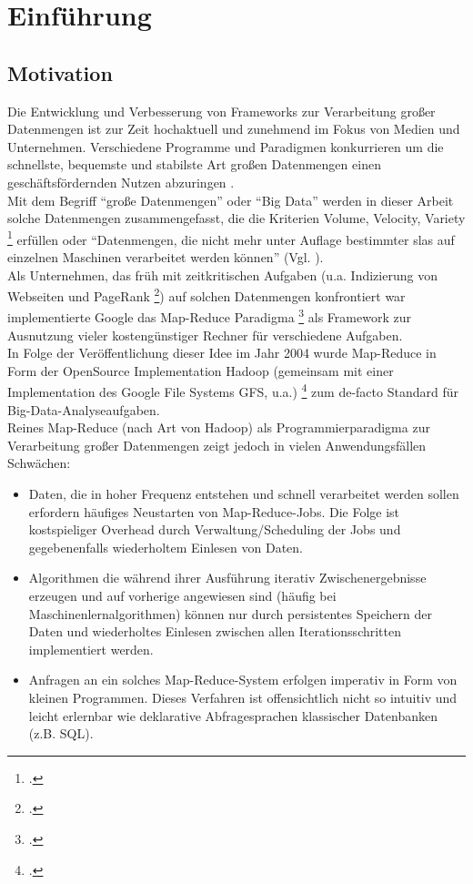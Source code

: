 \chapter{Einführung}

\section{Motivation}

Die Entwicklung und Verbesserung von Frameworks zur Verarbeitung großer Datenmengen ist zur Zeit hochaktuell und zunehmend im Fokus von Medien und Unternehmen. Verschiedene Programme und Paradigmen konkurrieren um die schnellste, bequemste und stabilste Art großen Datenmengen einen geschäftsfördernden Nutzen abzuringen \cite{Sin14}.\\

Mit dem Begriff "`große Datenmengen"' oder "`Big Data"' werden in dieser Arbeit solche Datenmengen zusammengefasst, die die Kriterien Volume, Velocity, Variety \footcite{Lan01} erfüllen oder "`Datenmengen, die nicht mehr unter Auflage bestimmter \gls{sla}s auf einzelnen Maschinen verarbeitet werden können"' (Vgl. \cite{Sam14}).\\

Als Unternehmen, das früh mit zeitkritischen Aufgaben (u.a.  Indizierung von Webseiten und PageRank \footcite{page2001method}) auf solchen Datenmengen konfrontiert war implementierte Google das Map-Reduce Paradigma \footcite{Dean04} als Framework zur Ausnutzung vieler kostengünstiger Rechner für verschiedene Aufgaben. \\

In Folge der Veröffentlichung dieser Idee im Jahr 2004 wurde Map-Reduce in Form der OpenSource Implementation Hadoop (gemeinsam mit einer Implementation des Google File Systems GFS, u.a.) \footcite{Ghema03} zum de-facto Standard für Big-Data-Analyseaufgaben.\\

Reines Map-Reduce (nach Art von Hadoop) als Programmierparadigma zur Verarbeitung großer Datenmengen zeigt jedoch in vielen Anwendungsfällen Schwächen:
\begin{itemize}
	\item Daten, die in hoher Frequenz entstehen und schnell verarbeitet werden sollen erfordern häufiges Neustarten von Map-Reduce-Jobs. Die Folge ist kostspieliger Overhead durch Verwaltung/Scheduling der Jobs und gegebenenfalls wiederholtem Einlesen von Daten.
	\item Algorithmen die während ihrer Ausführung iterativ Zwischenergebnisse erzeugen und auf vorherige angewiesen sind (häufig bei Maschinenlernalgorithmen) können nur durch persistentes Speichern der Daten und wiederholtes Einlesen zwischen allen Iterationsschritten implementiert werden.
	\item Anfragen an ein solches Map-Reduce-System erfolgen imperativ in Form von kleinen Programmen. Dieses Verfahren ist offensichtlich nicht so intuitiv und leicht erlernbar wie deklarative Abfragesprachen klassischer Datenbanken (z.B. SQL).
\end{itemize}

